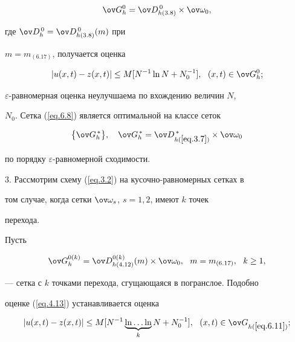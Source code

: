 \begin{equation} \label{eq.6.8}


\ov G^0_h=\ov D^{\,0}_{h(3.8)}\times \ov\omega_0,


\end{equation}


где $\ov D^{\,0}_h=\ov D^{\,0}_{h(3.8)}(m)$ при


$m=m_{(6.17)}$, получается оценка


\begin{equation} \label{eq.6.9}


|u(x,t)-z(x,t)|\le M [N^{-1}\ln N+N_0^{-1}], \ \ (x,t)\in \ov G_h^0;


\end{equation}


$\varepsilon$-равномерная оценка неулучшаема по вхождению величин $N$,


$N_0$. Сетка (\ref{eq.6.8}) является оптимальной на классе сеток


\begin{equation} \label{eq.6.10}


\big\{\ov G^{\,*}_h\big\}, \ \ \


\ov G^{\,*}_h=\ov D^{\,*}_{h(\ref{eq.3.7})}\times\ov\omega_0


\end{equation}


по порядку $\varepsilon$-равномерной сходимости.





3. Рассмотрим схему (\ref{eq.3.2}) на кусочно-равномерных сетках в


том случае, когда сетки $\ov\omega_s$, $s=1,2$, имеют $k$ точек


перехода.


Пусть


\begin{equation} \label{eq.6.11}


\ov G^{0(k)}_h=\ov D^{0(k)}_{h(4.12)}(m)\times\ov\omega_0, \ \ 


m=m_{(6.17)}, \ \ k\ge 1,


\end{equation}


--- сетка с $k$ точками перехода, сгущающаяся в погранслое. Подобно


оценке (\ref{eq.4.13}) устанавливается оценка


\begin{equation} \label{eq.6.12}


|u(x,t)-z(x,t)|\le M


[N^{-1}\underbrace{\ln\dotsc\ln}_{k}N+N_0^{-1}], \ \ 


(x,t)\in \ov G_{h(\ref{eq.6.11})};


\end{equation}


